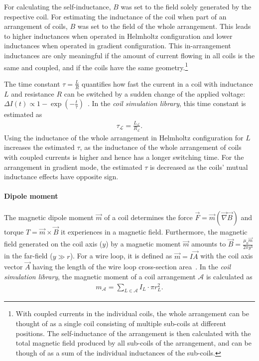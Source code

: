 For calculating the self-inductance, $B$ was set to the field solely generated by the respective coil. For estimating the inductance of the coil when part of an arrangement of coils, $B$ was set to the field of the whole arrangement. This leads to higher inductances when operated in Helmholtz configuration and lower inductances when operated in gradient configuration. This in-arrangement inductances are only meaningful if the amount of current flowing in all coils is the same and coupled, and if the coils have the same geometry.\footnote{With coupled currents in the individual coils, the whole arrangement can be thought of as a single coil consisting of multiple sub-coils at different positions. The self-inductance of the arrangement is then calculated with the total magnetic field produced by all sub-coils of the arrangement, and can be though of as a sum of the individual inductances of the sub-coils.}

The time constant $\tau = \frac{L}{R}$ quantifies how fast the current in a coil with inductance $L$ and resistance $R$ can be switched by a sudden change of the applied voltage: $\Delta I(t) \propto 1-\exp \left(-\frac{t}{\tau}\right)$~\cite{demtroder_zeitlich_2013}. In the \textit{coil simulation library}, this time constant is estimated as
\begin{align}
    \tau_\mathcal{L} = \frac{L_\mathcal{L}}{R_\mathcal{L}}.
\end{align}
Using the inductance of the whole arrangement in Helmholtz configuration for $L$ increases  the estimated $\tau$, as the inductance of the whole arrangement of coils with coupled currents is higher and hence has a longer switching time. For the arrangement in gradient mode, the estimated $\tau$ is decreased as the coils' mutual inductance effects have opposite sign.

\paragraph{Dipole moment}
The magnetic dipole moment $\vec m$ of a coil determines the force $\vec F = \vec m (\vec \nabla \vec B)$ and torque $T = \vec m \times \vec B$ it experiences in a magnetic field. Furthermore, the magnetic field generated on the coil axis ($y$) by a magnetic moment $\vec m$ amounts to $\vec B = \frac{\mu_0 \vec m}{2\pi y^3}$ in the far-field ($y \gg r$). For a wire loop, it is defined as $\vec m = I \vec A$ with the coil axis vector $\vec A$ having the length of the wire loop cross-section area~\cite{demtroder_statische_2013}. In the \textit{coil simulation library}, the magnetic moment of a coil arrangement $\mathcal{A}$ is calculated as
\begin{align}
    m_\mathcal{A} = \sum\limits_{L \in \mathcal{A}} I_L \cdot \pi r_L^2.
\end{align}

